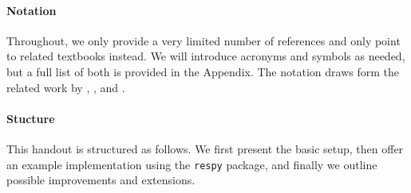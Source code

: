 \paragraph{Notation} Throughout, we only provide a very limited number of references and only point to related textbooks instead. We will introduce acronyms and symbols as needed, but a full list of both is provided in the Appendix. The notation draws form the related work by \cite{Puterman.1994}, \cite{Aguirregabiria.2010}, and \cite{Arcidiacono.2011}.

\paragraph{Stucture} This handout is structured as follows. We first present the basic setup, then offer an example implementation using the \verb+respy+ package, and finally we outline possible improvements and extensions.
